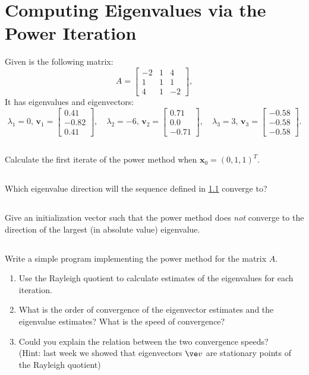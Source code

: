 \documentclass[11pt,letterpaper]{article}
\begin{document}
\section{Computing Eigenvalues via the Power Iteration}
Given is the following matrix:
\[
A=\begin{bmatrix}
-2 & 1 & 4  \\ 1 & 1 & 1 \\ 4 & 1 & -2 \end{bmatrix},
\]
It has eigenvalues and eigenvectors:
\[
\lambda_1=0,
\, {\boldsymbol v_1}
=\begin{bmatrix}
0.41  \\ -0.82 \\ 0.41 \end{bmatrix},\quad
\lambda_2=-6,
\,{\boldsymbol v_2}
=\begin{bmatrix}
0.71  \\ 0.0 \\ -0.71 \end{bmatrix},\quad
\lambda_3=3, \,{\boldsymbol v_3}
=\begin{bmatrix}
-0.58  \\ -0.58 \\ -0.58 \end{bmatrix}.
\]

\subsection{}\label{sec:1.a}
Calculate the first iterate of the power method when ${\boldsymbol x_0}=(0,1,1)^T$.

\subsection{}
Which eigenvalue direction will the sequence defined in \ref{sec:1.a} converge to?
  
\subsection{}
Give an initialization vector such that the power method does \emph{not} converge to the direction of the largest (in absolute value) eigenvalue.
  
\subsection{}\label{sec:1d}
Write a simple program implementing the power method for the matrix $A$.
\begin{enumerate}
    \item Use the Rayleigh quotient to calculate estimates of the eigenvalues for each iteration.
    \item What is the order of convergence of the eigenvector estimates and the eigenvalue estimates? What is the speed of convergence?
    \item Could you explain the relation between the two convergence speeds? \\
    (Hint: last week we showed that eigenvectors $\ve v$ are stationary points of the Rayleigh quotient)
\end{enumerate}
\end{document}
